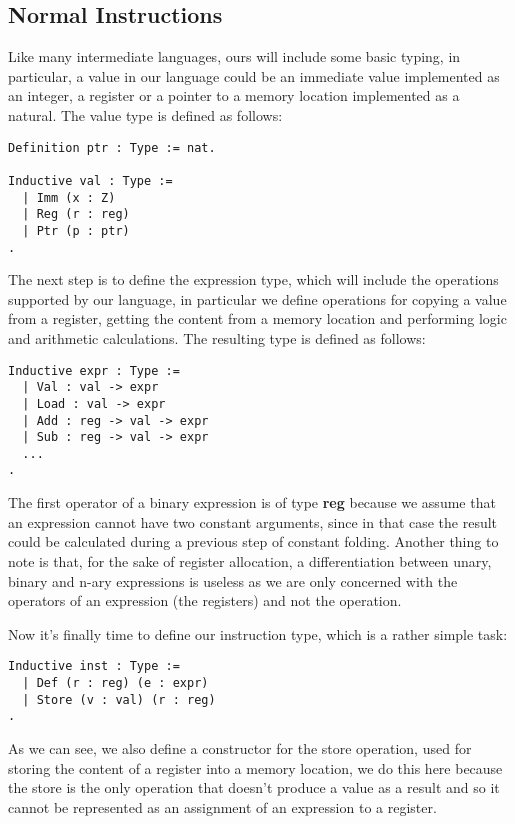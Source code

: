 \subsection{Normal Instructions}

Like many intermediate languages, ours will include some basic typing, in particular, a value in our language could be an immediate value implemented as an integer, a register or a pointer to a memory location implemented as a natural. The value type is defined as follows:

\begin{lstlisting}[language=Coq]
Definition ptr : Type := nat.

Inductive val : Type :=
  | Imm (x : Z)
  | Reg (r : reg)
  | Ptr (p : ptr)
.
\end{lstlisting}

The next step is to define the expression type, which will include the operations supported by our language, in particular we define operations for copying a value from a register, getting the content from a memory location and performing logic and arithmetic calculations. The resulting type is defined as follows:

\begin{lstlisting}[language=Coq]
Inductive expr : Type :=
  | Val : val -> expr
  | Load : val -> expr
  | Add : reg -> val -> expr
  | Sub : reg -> val -> expr
  ...
.
\end{lstlisting}

The first operator of a binary expression is of type \textbf{reg} because we assume that an expression cannot have two constant arguments, since in that case the result could be calculated during a previous step of constant folding.
Another thing to note is that, for the sake of register allocation, a differentiation between unary, binary and n-ary expressions is useless as we are only concerned with the operators of an expression (the registers) and not the operation.

Now it's finally time to define our instruction type, which is a rather simple task:

\begin{lstlisting}[language=Coq]
  Inductive inst : Type :=
  | Def (r : reg) (e : expr)
  | Store (v : val) (r : reg)
.
\end{lstlisting}

As we can see, we also define a constructor for the store operation, used for storing the content of a register into a memory location, we do this here because the store is the only operation that doesn't produce a value as a result and so it cannot be represented as an assignment of an expression to a register.


